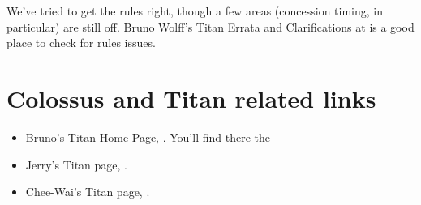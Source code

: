 \documentclass{article}
\begin{document}
We've tried to get the rules right, though a few areas (concession timing,
in particular) are still off. Bruno Wolff's Titan Errata and Clarifications
at
is a good place to check for rules issues.

\section{Colossus and Titan related links}

\begin{itemize}

\item Bruno's Titan Home Page,
.
You'll find there the

\item Jerry's Titan page,
.

\item Chee-Wai's Titan page,
.

\end{itemize}
\end{document}
